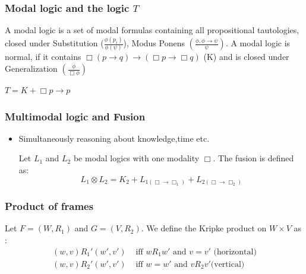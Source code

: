 \documentclass[hyperref={pdfpagelabels=false},t,10pt]{beamer}
\begin{document}
\begin{frame}
  \frametitle{Modal logic and the logic $T$}
  \begin{definition}
    A modal logic is a set of modal formulas containing all propositional tautologies, closed under Substitution ($\frac{\phi(p_i)}{\phi(\psi)}$), Modus Ponens $(\frac{\phi, \phi \rightarrow \psi}{\psi})$. \newline \newline \pause
    A modal logic is normal, if it contains $\Box (p \rightarrow q) \rightarrow (\Box p \rightarrow \Box q)$ (K) and is closed under Generalization $(\frac{\phi}{\Box \phi})$
  \end{definition}

  \begin{definition}
      $T = K + \Box p \rightarrow p$
  \end{definition}
\end{frame}



\begin{frame}
  \frametitle{Multimodal logic and Fusion}
  \begin{itemize}
    \item Simultaneously reasoning about knowledge,time etc. 
       \begin{definition}
      Let $L_1$ and $L_2$ be modal logics with one modality $\Box$. The fusion is defined as:
      $$ L_1 \otimes L_2 = K_2 + L_{1(\Box \rightarrow \Box_1)} + L_{2(\Box \rightarrow \Box_2)} $$    
    \end{definition}

  \end{itemize}
\end{frame}

\begin{frame}
  \frametitle{Product of frames}
 
    \begin{definition}
      Let $F = (W, R_1)$ and $G = (V, R_2)$. We define the Kripke product on $W \times V$ as : 
        \begin{align*}
              (w,v)R_1'(w',v') &\text{ iff } wR_1w' \mbox{ and } v = v' \text{  (horizontal)} \\
              (w,v)R_2  '(w',v') &\text{ iff } w = w' \mbox{ and } vR_2v' \text{(vertical)}
      \end{align*}  

  \end{definition}
\end{frame}
\end{document}
